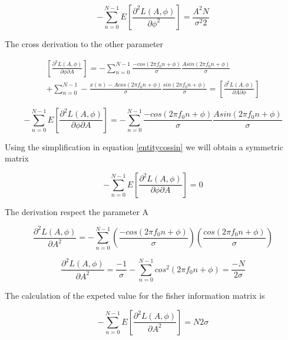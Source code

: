 \documentclass{report}
\begin{document}
\begin{equation}\label{key}
-\sum_{n=0}^{N-1} E[\frac{\partial^2 L(A,\phi)}{\partial \phi^2}] = 
\frac{A^2N}{\sigma^2 2}
\end{equation} 

The cross derivation to the other parameter

\begin{gather*}\label{key}
[\frac{\partial^2 L(A,\phi)}{\partial \phi \partial A}] = -\sum_{n=0}^{N-1} 
\frac{- cos(2\pi f_0 n +\phi)}{\sigma} \frac{Asin(2\pi f_0 n +\phi)}{\sigma} 
\\  + \sum_{n=0}^{N-1} - \frac{x(n)- Acos(2\pi f_0 n +\phi)}{\sigma} 
\frac{sin(2\pi f_0 n +\phi)}{\sigma} = [\frac{\partial^2 L(A,\phi)}{ \partial 
	A\partial \phi}] 
\end{gather*}

\begin{equation}\label{key}
-\sum_{n=0}^{N-1} E[\frac{\partial^2 L(A,\phi)}{\partial \phi \partial A}] = 
-\sum_{n=0}^{N-1} \frac{- cos(2\pi f_0 n +\phi)}{\sigma} \frac{Asin(2\pi f_0 n 
	+\phi)}{\sigma}
\end{equation} 

Using the simplification in equation \ref{entitycossin} we will obtain a 
symmetric matrix

\begin{equation}\label{key}
-\sum_{n=0}^{N-1} E[\frac{\partial^2 L(A,\phi)}{\partial \phi \partial A}] = 0
\end{equation} 

The derivation respect the parameter A

\begin{equation}
\frac{\partial^2 L(A,\phi)}{\partial A ^2} = -\sum_{n=0}^{N-1} 
(\frac{-cos(2\pi f_0 n + \phi)}{\sigma})(\frac{cos(2\pi f_0n + \phi)}{\sigma})
\end{equation}



\begin{equation}
\frac{\partial^2 L(A,\phi)}{\partial A ^2} = \frac{-1}{\sigma}-\sum_{n=0}^{N-1} 
cos^2(2\pi f_0 n + \phi) = \frac{-N}{2\sigma}
\end{equation}

The calculation of the expeted value for the fisher information matrix is

\begin{equation}
-\sum_{n=0}^{N-1} E[\frac{\partial^2 L(A,\phi)}{\partial A^2}] = {N}{2\sigma}
\end{equation} 
\end{document}
